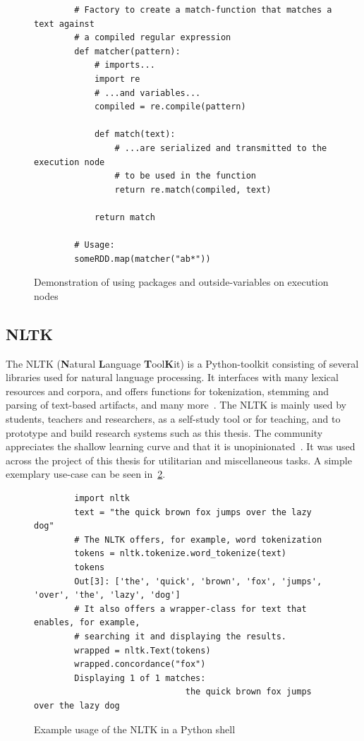 \begin{figure}
    \caption{Demonstration of using packages and outside-variables on execution nodes}
    \label{code:factory}
    \begin{verbatim}
        # Factory to create a match-function that matches a text against
        # a compiled regular expression
        def matcher(pattern):
            # imports...
            import re
            # ...and variables...
            compiled = re.compile(pattern)

            def match(text):
                # ...are serialized and transmitted to the execution node
                # to be used in the function
                return re.match(compiled, text)

            return match

        # Usage:
        someRDD.map(matcher("ab*"))
    \end{verbatim}
\end{figure}

\subsection{NLTK}
\label{subsec:nltk}

The NLTK (\textbf{N}atural \textbf{L}anguage \textbf{T}ool\textbf{K}it) is a Python-toolkit consisting of several libraries used for
natural language processing.
It interfaces with many lexical resources and corpora, and offers functions for tokenization, stemming and parsing of text-based artifacts,
and many more~\cite{nltkDocs}.
The NLTK is mainly used by students, teachers and researchers, as a self-study tool or for teaching,
and to prototype and build research systems such as this thesis.
The community appreciates the shallow learning curve and that it is unopinionated~\cite{Bird2006}.
It was used across the project of this thesis for utilitarian and miscellaneous tasks.
A simple exemplary use-case can be seen in~\cref{code:nltk}.

\begin{figure}
    \caption{Example usage of the NLTK in a Python shell}
    \label{code:nltk}
    \begin{verbatim}
        import nltk
        text = "the quick brown fox jumps over the lazy dog"
        # The NLTK offers, for example, word tokenization
        tokens = nltk.tokenize.word_tokenize(text)
        tokens
        Out[3]: ['the', 'quick', 'brown', 'fox', 'jumps', 'over', 'the', 'lazy', 'dog']
        # It also offers a wrapper-class for text that enables, for example,
        # searching it and displaying the results.
        wrapped = nltk.Text(tokens)
        wrapped.concordance("fox")
        Displaying 1 of 1 matches:
                              the quick brown fox jumps over the lazy dog
    \end{verbatim}
\end{figure}

